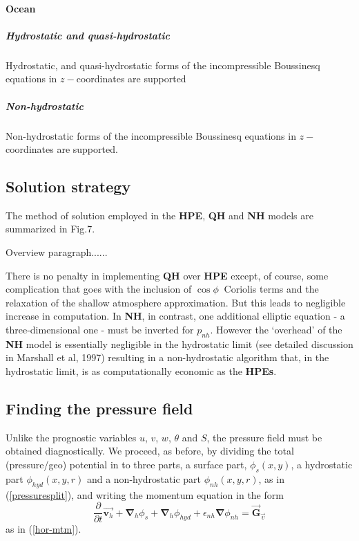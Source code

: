 \paragraph{Ocean}

\subparagraph{Hydrostatic and quasi-hydrostatic}

Hydrostatic, and quasi-hydrostatic forms of the incompressible Boussinesq
equations in $z-$coordinates are supported

\subparagraph{Non-hydrostatic }

Non-hydrostatic forms of the incompressible Boussinesq equations in $z-$%
coordinates are supported.

\subsection{Solution strategy}

The method of solution employed in the \textbf{HPE}, \textbf{QH} and \textbf{%
NH} models are summarized in Fig.7.%

Overview paragraph......

There is no penalty in implementing \textbf{QH} over \textbf{HPE} except, of
course, some complication that goes with the inclusion of $\cos \phi \ $%
Coriolis terms and the relaxation of the shallow atmosphere approximation.
But this leads to negligible increase in computation. In \textbf{NH}, in
contrast, one additional elliptic equation - a three-dimensional one - must
be inverted for $p_{nh}$. However the `overhead' of the \textbf{NH} model is
essentially negligible in the hydrostatic limit (see detailed discussion in
Marshall et al, 1997) resulting in a non-hydrostatic algorithm that, in the
hydrostatic limit, is as computationally economic as the \textbf{HPEs}.

\subsection{Finding the pressure field}

Unlike the prognostic variables $u$, $v$, $w$, $\theta $ and $S$, the
pressure field must be obtained diagnostically. We proceed, as before, by
dividing the total (pressure/geo) potential in to three parts, a surface
part, $\phi _{s}(x,y)$, a hydrostatic part $\phi _{hyd}(x,y,r)$ and a
non-hydrostatic part $\phi _{nh}(x,y,r)$, as in (\ref{pressuresplit}), and
writing the momentum equation in the form 
\begin{equation}
\frac{\partial }{\partial t}\vec{\mathbf{v}_{h}}+\mathbf{\nabla }_{h}\phi
_{s}+\mathbf{\nabla }_{h}\phi _{hyd}+\epsilon _{nh}\mathbf{\nabla }\phi
_{nh}=\vec{\mathbf{G}}_{\vec{v}}  \label{mtm-split}
\end{equation}
as in (\ref{hor-mtm}).

